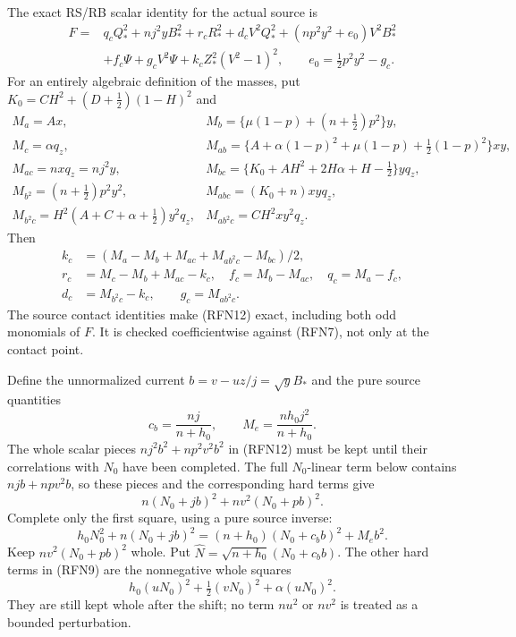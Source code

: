 The exact RS/RB scalar identity for the actual source is
\begin{align}
 F={}&q_cQ_*^2+nj^2y B_*^2+r_cR_*^2+d_cV^2Q_*^2
   +(np^2y^2+e_0)V^2B_*^2\\
   &+f_c\Psi+g_cV^2\Psi+k_cZ_*^2(V^2-1)^2,
 \qquad e_0=\tfrac12p^2y^2-g_c.                        \tag{RFN12}
\end{align}
For an entirely algebraic definition of the masses, put
$K_0=CH^2+(D+\tfrac12)(1-H)^2$ and
\[
\begin{array}{ll}
 M_a=Ax,&M_b=\{\mu(1-p)+(n+\tfrac12)p^2\}y,\\
 M_c=\alpha q_z,&
 M_{ab}=\{A+\alpha(1-p)^2+\mu(1-p)+\tfrac12(1-p)^2\}xy,\\
 M_{ac}=nxq_z=nj^2y,&
 M_{bc}=\{K_0+AH^2+2H\alpha+H-\tfrac12\}yq_z,\\
 M_{b^2}=(n+\tfrac12)p^2y^2,&M_{abc}=(K_0+n)xyq_z,\\
 M_{b^2c}=H^2(A+C+\alpha+\tfrac12)y^2q_z,&
 M_{ab^2c}=CH^2xy^2q_z.
\end{array}
\]
Then
\[
\begin{split}
 k_c&=(M_a-M_b+M_{ac}+M_{ab^2c}-M_{bc})/2,\\
 r_c&=M_c-M_b+M_{ac}-k_c,\quad f_c=M_b-M_{ac},\quad q_c=M_a-f_c,\\
 d_c&=M_{b^2c}-k_c,\qquad g_c=M_{ab^2c}.
\end{split}
\]
The source contact identities make (RFN12) exact, including both odd
monomials of $F$.  It is checked coefficientwise against (RFN7), not
only at the contact point.

Define the unnormalized current $b=v-uz/j=\sqrt y B_*$ and the
pure source quantities
\[
 c_b=\frac{nj}{n+h_0},\qquad M_e=\frac{nh_0j^2}{n+h_0}.
                                                               \tag{RFN13}
\]
The whole scalar pieces $nj^2b^2+np^2v^2b^2$ in (RFN12) must be kept
until their correlations with $N_0$ have been completed.  The full
$N_0$-linear term below contains $njb+npv^2b$, so these pieces and the
corresponding hard terms give
\[
 n(N_0+jb)^2+n v^2(N_0+pb)^2.
\]
Complete only the first square, using a pure source inverse:
\[
 h_0N_0^2+n(N_0+jb)^2
   =(n+h_0)(N_0+c_bb)^2+M_e b^2.                       \tag{RFN14}
\]
Keep $nv^2(N_0+pb)^2$ whole.  Put
$\widehat N=\sqrt{n+h_0}(N_0+c_bb)$.
The other hard terms in (RFN9) are the nonnegative whole squares
\[
 h_0(uN_0)^2+\tfrac12(vN_0)^2+\alpha(uN_0)^2.             \tag{RFN15}
\]
They are still kept whole after the shift; no term $nu^2$ or $nv^2$
is treated as a bounded perturbation.

